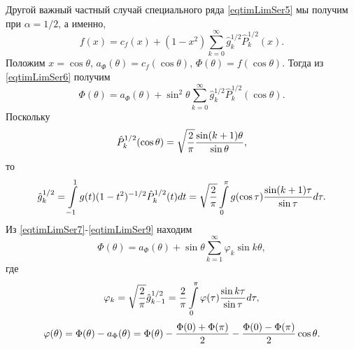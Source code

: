 Другой важный частный случай специального ряда \eqref{eqtimLimSer5} мы получим при  $\alpha=1/2$, а именно,
\begin{equation}\label{eqtimLimSer6}%
f(x)=c_f(x)+(1-x^2) \sum_{k=0}^\infty\hat g_k^{1/2}\hat P_k^{1/2}(x).
\end{equation}
Положим $x=\cos\theta$, $a_\Phi(\theta)=c_f(\cos\theta)$, $\Phi(\theta)=f(\cos\theta)$. Тогда из \eqref{eqtimLimSer6} получим
\begin{equation}\label{eqtimLimSer7}%
 \Phi(\theta)=a_\Phi(\theta)+\sin^2\theta \sum_{k=0}^\infty\hat g_k^{1/2}\hat P_k^{1/2}(\cos\theta).
\end{equation}
Поскольку
\begin{equation}\label{eqtimLimSer8}%
\hat P_k^{1/2}(\cos\theta)=\sqrt{\frac2\pi}{\sin(k+1)\theta\over\sin\theta},
\end{equation}
то
\begin{equation}\label{eqtimLimSer9}%
\hat g_k^{1/2}=
\int\limits_{-1}^1g(t)(1-t^2)^{-1/2}\hat P_k^{1/2}(t)dt=\sqrt{\frac2\pi}
\int\limits_{0}^\pi g(\cos\tau){\sin(k+1)\tau\over\sin\tau}d\tau.
\end{equation}
Из \eqref{eqtimLimSer7}-\eqref{eqtimLimSer9} находим
\begin{equation}\label{eqtimLimSer10}
 \Phi(\theta)=a_\Phi(\theta)+\sin\theta \sum_{k=1}^\infty\varphi_k\sin k \theta,
\end{equation}
где
\begin{equation}\label{eqtimLimSer11}
\varphi_k=\sqrt{\frac2\pi}\hat g_{k-1}^{1/2}={\frac2\pi}
\int\limits_{0}^\pi \varphi(\tau){\sin k\tau\over\sin\tau}d\tau,
\end{equation}
\begin{equation}\label{eqtimLimSer12}
\varphi(\theta)=\Phi(\theta)-a_\Phi(\theta)=\Phi(\theta)-{\Phi(0)+\Phi(\pi)\over2}-
{\Phi(0)-\Phi(\pi)\over2}\cos\theta.
\end{equation}

